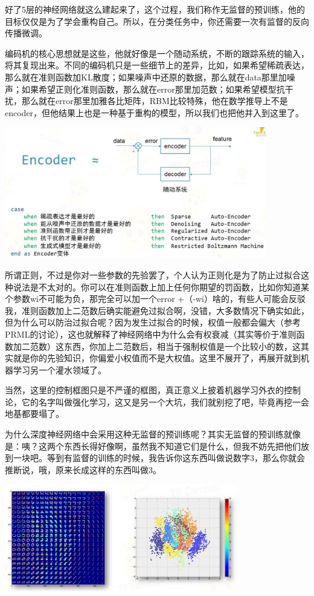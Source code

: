 \documentclass{article}
\begin{document}
好了5层的神经网络就这么建起来了，这个过程，我们称作无监督的预训练，他的目标仅仅是为了学会重构自己。所以，在分类任务中，你还需要一次有监督的反向传播微调。


编码机的核心思想就是这些，他就好像是一个随动系统，不断的跟踪系统的输入，将其复现出来。不同的编码机只是一些细节上的差异，比如，如果希望稀疏表达，那么就在准则函数加KL散度；如果噪声中还原的数据，那么就在data那里加噪声；如果希望正则化准则函数，那么就在error那里加范数；如果希望模型抗干扰，那么就在error那里加雅各比矩阵，RBM比较特殊，他在数学推导上不是encoder，但他结果上也是一种基于重构的模型，所以我们也把他并入到这里了。

\begin{center}
\includegraphics[width=4.5in]{image/image21.jpg}
\end{center}


所谓正则，不过是你对一些参数的先验罢了，个人认为正则化是为了防止过拟合这种说法是不太对的。你可以在准则函数上加上任何你期望的罚函数，比如你知道某个参数wi不可能为负，那完全可以加一个error +（-wi）啥的，有些人可能会反驳我，准则函数加上二范数后确实能避免过拟合啊，没错，大多数情况下确实如此，但为什么可以防治过拟合呢？因为发生过拟合的时候，权值一般都会偏大（参考PRML的讨论），这也就解释了神经网络中为什么会有权衰减（其实等价于准则函数加二范数）这东西，你加上二范数后，相当于强制权值是一个比较小的数，这其实就是你的先验知识，你偏爱小权值而不是大权值。这里不展开了，再展开就到机器学习另一个灌水领域了。

当然，这里的控制框图只是不严谨的框图，真正意义上披着机器学习外衣的控制论，它的名字叫做强化学习，这又是另一个大坑，我们就别挖了吧，毕竟再挖一会地基都要塌了。




为什么深度神经网络中会采用这种无监督的预训练呢？其实无监督的预训练就像是：咦？这两个东西长得好像啊，虽然我不知道它们是什么，但我不妨先把他们放到一块吧。等到有监督的训练的时候，我告诉你这东西叫做说数字3，那么你就会推断说，哦，原来长成这样的东西叫做3。
\begin{center}
\includegraphics[width=4in]{image/image22.jpg}
\end{center}
\end{document}
